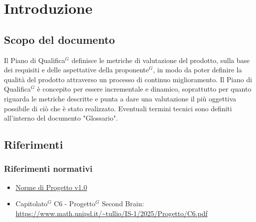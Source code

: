 \documentclass[a4paper,10pt]{article}
\begin{document}
\newpage

\tableofcontents

\newpage

\section{Introduzione}
\subsection{Scopo del documento}
Il Piano di Qualifica$^G$ definisce le metriche di valutazione del prodotto, sulla base dei requisiti e delle aspettative della proponente$^G$, in modo da poter definire la qualità del prodotto attraverso un processo di continuo miglioramento.
Il Piano di Qualifica$^G$ è concepito per essere incrementale e dinamico, soprattutto per quanto riguarda le metriche descritte e punta a dare una valutazione il più oggettiva possibile di ciò che è stato realizzato. Eventuali termini tecnici sono definiti all'interno del documento "Glossario".
\subsection{Riferimenti}
\subsubsection{Riferimenti normativi}
\begin{itemize}
    \item \href{https://tool-8.github.io/Documentazione-SWE/}{Norme di Progetto v1.0}
    \item Capitolato$^G$ C6 - Progetto$^G$ Second Brain:    \\ \url{https://www.math.unipd.it/~tullio/IS-1/2025/Progetto/C6.pdf}
\end{itemize}
\end{document}
